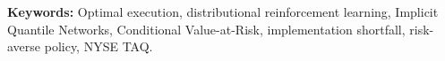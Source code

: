 \documentclass[11pt]{article}
\begin{document}


\textbf{Keywords:} Optimal execution, distributional reinforcement learning, Implicit Quantile Networks, Conditional Value-at-Risk, implementation shortfall, risk-averse policy, NYSE TAQ.
\end{document}
